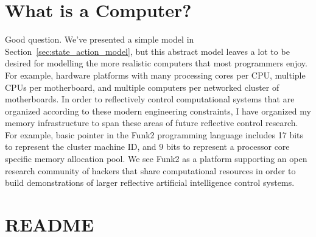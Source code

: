 \section{What is a Computer?}
\label{sec:what_is_a_computer}

Good question.  We've presented a simple model in
Section~\ref{sec:state_action_model}, but this abstract model leaves a
lot to be desired for modelling the more realistic computers that most
programmers enjoy.  For example, hardware platforms with many
processing cores per CPU, multiple CPUs per motherboard, and multiple
computers per networked cluster of motherboards.  In order to
reflectively control computational systems that are organized
according to these modern engineering constraints, I have organized my
memory infrastructure to span these areas of future reflective control
research.  For example, basic pointer in the Funk2 programming
language includes 17 bits to represent the cluster machine ID, and 9
bits to represent a processor core specific memory allocation pool.
We see Funk2 as a platform supporting an open research community of
hackers that share computational resources in order to build
demonstrations of larger reflective artificial intelligence control
systems.


\section{README}

